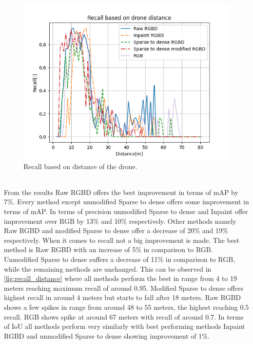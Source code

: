 \documentclass[twoside]{ctuthesis}
\theoremstyle{plain}
\theoremstyle{definition}
\theoremstyle{note}
\begin{document}
\begin{figure}
	\centering
	\includegraphics[width=\textwidth]{recall_distance.png}
	\caption{Recall based on distance of the drone.} \label{fig:recall_distance}
\end{figure}\\
From the results Raw RGBD offers the best improvement in terms of mAP by 7\%. Every method except unmodified Sparse to dense offers some improvement in terms of mAP. In terms of precision unmodified Sparse to dense and Inpaint offer improvement over RGB by 13\% and 10\% respectively. Other methods namely Raw RGBD and modified Sparse to dense offer a decrease of 20\% and 19\% respectively. When it comes to recall not a big improvement is made. The best method is Raw RGBD with an increase of 5\% in comparison to RGB. Unmodified Sparse to dense suffers a decrease of 11\% in comparison to RGB, while the remaining methods are unchanged. This can be observed in \autoref{fig:recall_distance} where all methods perform the best in range from 4 to 19 meters reaching maximum recall of around 0.95. Modified Sparse to dense offers highest recall in around 4 meters but starts to fall after 18 meters. Raw RGBD shows a few spikes in range from around 48 to 55 meters, the highest reaching 0.5 recall. RGB shows spike at around 67 meters with recall of around 0.7. In terms of IoU all methods perform very similarly with best performing methods Inpaint RGBD and unmodified Sparse to dense showing improvement of 1\%.
\pagebreak
\end{document}
